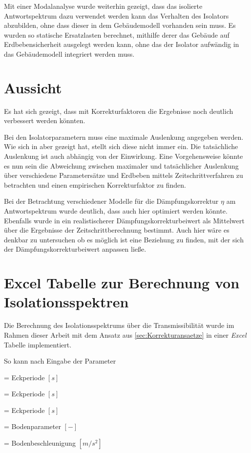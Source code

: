 Mit einer Modalanalyse wurde weiterhin gezeigt, dass das isolierte Antwortspektrum dazu verwendet werden kann das Verhalten des Isolators abzubilden, ohne dass dieser in dem Gebäudemodell vorhanden sein muss.
Es wurden so statische Ersatzlasten berechnet, mithilfe derer das Gebäude auf Erdbebensicherheit ausgelegt werden kann, ohne das der Isolator aufwändig in das Gebäudemodell integriert werden muss.

\section{Aussicht}

Es hat sich gezeigt, dass mit Korrekturfaktoren die Ergebnisse noch deutlich verbessert werden könnten.

Bei den Isolatorparametern muss eine maximale Auslenkung angegeben werden. Wie sich in \cite{Isemann} aber gezeigt hat, stellt sich diese nicht immer ein. Die tatsächliche Auslenkung ist auch abhängig von der Einwirkung.
Eine Vorgehensweise könnte es nun sein die Abweichung zwischen maximaler und tatsächlicher Auslenkung über verschiedene Parametersätze und Erdbeben mittels Zeitschrittverfahren zu betrachten und einen empirischen Korrekturfaktor zu finden.

Bei der Betrachtung verschiedener Modelle für die Dämpfungskorrektur $\eta$ am Antwortspektrum wurde deutlich, dass auch hier optimiert werden könnte. Ebenfalls wurde in \cite{Isemann} ein realistischerer Dämpfungskorrekturbeiwert als Mittelwert über die Ergebnisse der Zeitschrittberechnung bestimmt. Auch hier wäre es denkbar zu untersuchen ob es möglich ist eine Beziehung zu finden, mit der sich der Dämpfungskorrekturbeiwert anpassen ließe.

\section{Excel Tabelle zur Berechnung von Isolationsspektren}

Die Berechnung des Isolationsspektrums über die Transmissibilität wurde im Rahmen dieser Arbeit mit dem Ansatz aus \cref{sec:Korrekturansaetze} in einer \emph{Excel} Tabelle implementiert.

So kann nach Eingabe der Parameter 

  = Eckperiode $[s]$ \par
{}  = Eckperiode $[s]$ \par
{}  = Eckperiode $[s]$ \par
{}    = Bodenparameter $[-]$ \par
{}  = Bodenbeschleunigung $[m/s^2]$ \par

